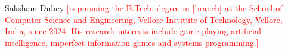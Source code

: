 \documentclass{ieeeaccess}
\newcommand{\pending}[1]{\textcolor{red}{[#1]}}
\begin{document}
\begin{IEEEbiography}{Saksham Dubey}
\pending{is pursuing the B.Tech. degree in [branch] at the School of Computer Science and
Engineering, Vellore Institute of Technology, Vellore, India, since 2024. His research interests
include game-playing artificial intelligence, imperfect-information games and systems
programming.}
\end{IEEEbiography}

\EOD
\end{document}
